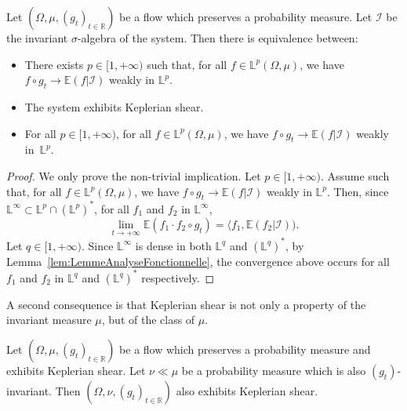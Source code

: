 \documentclass[AHL,Unicode,longabstracts]{cedram}
\newcommand{\R}{\mathbb{R}}
\newcommand{\Ebb}{\mathbb{E}}
\newcommand{\Lbb}{\mathbb{L}}
\newcommand{\Ical}{\mathcal{I}}
\begin{document}
\begin{prop}
Let $(\Omega, \mu, (g_t)_{t \in \R})$ be a flow which preserves a probability measure. Let $\Ical$ be the invariant $\sigma$-algebra of the system. Then there is equivalence between:
\begin{itemize}
\item There exists $p \in [1, + \infty)$ such that, for all $f \in \Lbb^p (\Omega, \mu)$, we have $f \circ g_t \to \Ebb (f | \Ical)$ weakly in $\Lbb^p$.
\item The system exhibits Keplerian shear.
\item For all $p \in [1, + \infty)$, for all $f \in \Lbb^p (\Omega, \mu)$, we have $f \circ g_t \to \Ebb (f | \Ical)$ weakly in~$\Lbb^p$.
\end{itemize}
\end{prop}

\begin{proof}
We only prove the non-trivial implication. Let $p \in [1, + \infty)$. Assume such that, for all $f \in \Lbb^p (\Omega, \mu)$, we have $f \circ g_t \to \Ebb (f | \Ical)$ weakly in $\Lbb^p$. Then, since $\Lbb^\infty \subset \Lbb^p \cap (\Lbb^p)^*$, for all $f_1$ and $f_2$ in $\Lbb^\infty$,
\[
\lim_{t \to + \infty} \Ebb(f_1 \cdot f_2 \circ g_t) = \langle f_1, \Ebb (f_2 | \Ical)).
\]
Let $q \in [1, + \infty)$. Since $\Lbb^\infty$ is dense in both $\Lbb^q$ and $(\Lbb^q)^*$, by Lemma~\ref{lem:LemmeAnalyseFonctionnelle}, the convergence above occurs for all $f_1$ and $f_2$ in $\Lbb^q$ and $(\Lbb^q)^*$ respectively.
\end{proof}
\goodbreak


A second consequence is that Keplerian shear is not only a property of the invariant measure $\mu$, but of the class of $\mu$.


\begin{prop}\label{prop:MesuresAbsContinues}

Let $(\Omega, \mu, (g_t)_{t \in \R})$ be a flow which preserves a probability measure and exhibits Keplerian shear. Let $\nu \ll \mu$ be a probability measure which is also $(g_t)$-invariant. Then $(\Omega, \nu, (g_t)_{t \in \R})$ also exhibits Keplerian shear.
\end{prop}
\end{document}
